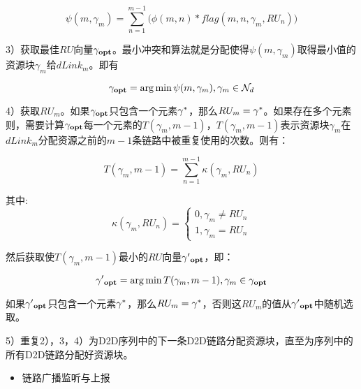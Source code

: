 \documentclass[figurelist,tablelist,algorithmlist,nomlist,masters]{seuthesix}
\begin{document}
	\begin{equation}\label{eq2.7}
	\psi (m,\gamma _m) = \sum\limits_{n = 1}^{m - 1} {(\phi (m,n)} *flag(m,n,\gamma _m,RU_n))
	\end{equation}
	
	3）获取最佳$RU$向量${\bf{\gamma _{opt}}}$。最小冲突和算法就是分配使得$\psi (m,\gamma _m)$取得最小值的资源块$\gamma _m$给$dLink_m$。即有
	
	\begin{equation}\label{eq2.8}
	{\bf{\gamma _{opt}}} = \arg \min \psi (m,\gamma _m) , \gamma _m \in \mathcal{N}_d
	\end{equation}
	
	4）获取$RU_m$。如果${\bf{\gamma _{opt}}}$只包含一个元素${\gamma ^{\rm{*}}}$，那么$RU_m = {\gamma ^{\rm{*}}}$。如果存在多个元素则，需要计算${\bf{\gamma _{opt}}}$每一个元素的$T(\gamma _m,m - 1)$，$T(\gamma _m,m - 1)$表示资源块$\gamma _m$在$dLink_m$分配资源之前的$m-1$条链路中被重复使用的次数。则有：
	
	\begin{equation}\label{eq2.9}
	T(\gamma _m,m - 1) = \sum\limits_{n = 1}^{m - 1} {\kappa (\gamma _m,RU_n)}
	\end{equation}
	
	其中:
	\begin{equation}\label{eq2.10}
	\kappa (\gamma _m,RU_n) = \left\{ \begin{array}{l}
	0,\gamma _m \ne RU_n\\
	1,\gamma _m = RU_n
	\end{array} \right.
	\end{equation}
	
	然后获取使$T(\gamma _m,m - 1)$最小的$RU$向量${\bf{\gamma }}{{\bf{'}}_{{\bf{opt}}}}$，即：
	
	\begin{equation}\label{eq2.11}
	{\bf{\gamma }}{{\bf{'}}_{{\bf{opt}}}} = \arg \min T(\gamma _m,m - 1), \gamma _m \in {\bf{\gamma _{opt}}}
	\end{equation}
	
	如果${\bf{\gamma }}{{\bf{'}}_{{\bf{opt}}}}$只包含一个元素${\gamma ^{\rm{*}}}$，那么$RU_m = {\gamma ^{\rm{*}}}$，否则这$RU_m$的值从${\bf{\gamma }}{{\bf{'}}_{{\bf{opt}}}}$中随机选取。
	
	5）重复2），3，4）为D2D序列中的下一条D2D链路分配资源块，直至为序列中的所有D2D链路分配好资源块。
	
	
	\begin{itemize}
		\item 链路广播监听与上报
	\end{itemize}
	
\end{document}
